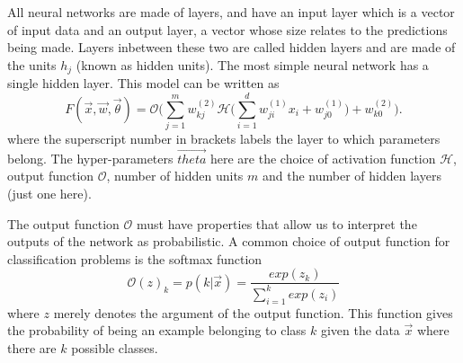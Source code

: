 All neural networks are made of layers, and have an input layer which is a
vector of input data and an output layer, a vector whose size relates to the
predictions being made. Layers inbetween these two are called hidden layers and
are made of the units $h_j$ (known as hidden units). The most simple neural
network has a single hidden layer. This model can be written as
\begin{equation}
F(\vec{x},\vec{w}, \vec{\theta}) = \mathcal{O} \Bigg( \sum_{j=1}^{m} w_{kj}^{(2)}
\mathcal{H} \Bigg( \sum_{i=1}^{d} w_{ji}^{(1)} x_{i} + w_{j0}^{(1)} \Bigg) + w_{k0}^{(2)} \Bigg).
\label{eq:basicnn}
\end{equation}
where the superscript number in brackets labels the layer to which parameters
belong. The hyper-parameters $\vec{theta}$ here are the choice of activation
function $\mathcal{H}$, output function $\mathcal{O}$, number of hidden units
$m$ and the number of hidden layers (just one here).

The output function $\mathcal{O}$ must have properties that allow us to
interpret the outputs of the network as probabilistic. A common choice of output
function for classification problems is the softmax function
\begin{equation}
  \mathcal{O}(z)_k = p(k|\vec{x}) = \frac{exp(z_k)}{\sum_{i=1}^kexp(z_i)}
  \label{eq:softmax}
\end{equation}
where $z$ merely denotes the argument of the output function. This function
gives the probability of being an example belonging to class $k$ given the data
$\vec{x}$ where there are $k$ possible classes.

